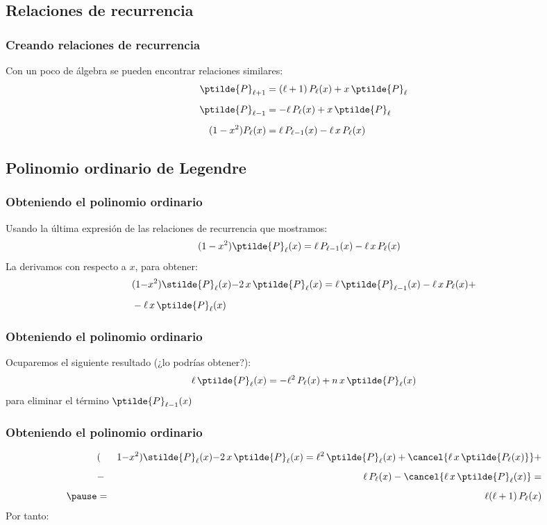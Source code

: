\subsection{Relaciones de recurrencia}
\begin{frame}
\frametitle{Creando relaciones de recurrencia}
Con un poco de álgebra se pueden encontrar relaciones similares:
\begin{align*}
\ptilde{P}_{\ell+1} &= (\ell + 1) \, P_{\ell}(x) + x \, \ptilde{P}_{\ell} \\[0.5em]
\ptilde{P}_{\ell-1} &= - \ell \, P_{\ell}(x) + x \, \ptilde{P}_{\ell} \\[0.5em]
(1 - x^{2}) P_\ell (x) &= \ell \, P_{\ell-1} (x) - \ell \, x \, P_{\ell} (x)
\end{align*}
\end{frame}
\subsection{Polinomio ordinario de Legendre}
\begin{frame}
\frametitle{Obteniendo el polinomio ordinario}
Usando la última expresión de las relaciones de recurrencia que mostramos:
\begin{align*}
(1 - x^{2}) \ptilde{P}_\ell (x) &= \ell \, P_{\ell-1} (x) - \ell \, x \, P_{\ell} (x)
\end{align*}
\pause
La derivamos con respecto a $x$, para obtener:
\begin{align*}
&(1 {-} x^{2}) \stilde{P}_\ell (x) {-} 2 \, x \, \ptilde{P}_\ell (x) = \ell \, \ptilde{P}_{\ell-1} (x) - \ell \, x \, P_{\ell} (x) + \\[0.5em]
&- \ell \, x \, \ptilde{P}_{\ell}(x)
\end{align*}
\end{frame}
\begin{frame}
\frametitle{Obteniendo el polinomio ordinario}
Ocuparemos el siguiente resultado \pause (¿lo podrías obtener?):
\begin{align*}
\ell \, \ptilde{P}_{\ell} (x) = - \ell^{2} \, P_{\ell} (x) +  n \, x \, \ptilde{P}_{\ell} (x)
\end{align*}
para eliminar el término $\ptilde{P}_{\ell-1} (x)$
\end{frame}
\begin{frame}
\frametitle{Obteniendo el polinomio ordinario}
\begin{eqnarray*}
&(&1 {-} x^{2}) \stilde{P}_\ell (x) {-} 2 \, x \, \ptilde{P}_\ell (x) = \ell^{2} \, \ptilde{P}_{\ell} (x) + \cancel{\ell \, x \, \ptilde{P_{\ell} (x)}} + \\[0.5em]
&-& \ell \, P_{\ell}(x) - \cancel{\ell \, x \, \ptilde{P}_{\ell}(x)} = \\[0.5em] \pause
&=& \ell (\ell + 1) \, P_{\ell} (x)
\end{eqnarray*}
Por tanto:
\end{frame}
